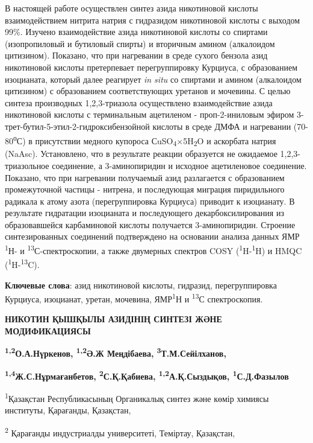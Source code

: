 В настоящей работе осуществлен синтез азида никотиновой кислоты
взаимодействием нитрита натрия с гидразидом никотиновой кислоты с
выходом 99\%. Изучено взаимодействие азида никотиновой кислоты со
спиртами (изопропиловый и бутиловый спирты) и вторичным амином
(алкалоидом цитизином). Показано, что при нагревании в среде сухого
бензола азид никотиновой кислоты претерпевает перегруппировку Курциуса,
с образованием изоцианата, который далее реагирует \emph{in situ} со
спиртами и амином (алкалоидом цитизином) с образованием соответствующих
уретанов и мочевины. С целью синтеза производных 1,2,3-триазола
осуществлено взаимодействие азида никотиновой кислоты с терминальным
ацетиленом - проп-2-иниловым эфиром
3-трет-бутил-5-этил-2-гидроксибензойной кислоты в среде ДМФА и
нагревании (70-80\textsuperscript{о}С) в присутствии медного купороса
СuSO\textsubscript{4}×5H\textsubscript{2}O и аскорбата натрия (NaAsc).
Установлено, что в результате реакции образуется не ожидаемое
1,2,3-триазольное соединение, а 3-аминопиридин и исходное ацетиленовое
соединение. Показано, что при нагревании получаемый азид разлагается с
образованием промежуточной частицы - нитрена, и последующая миграция
пиридильного радикала к атому азота (перегруппировка Курциуса) приводит
к изоцианату. В результате гидратации изоцианата и последующего
декарбоксилирования из образовавшейся карбаминовой кислоты получается
3-аминопиридин. Строение синтезированных соединений подтверждено на
основании анализа данных ЯМР \textsuperscript{1}Н- и
\textsuperscript{13}С-спектроскопии, а также двумерных спектров COSY
(\textsuperscript{1}H-\textsuperscript{1}H) и HMQC
(\textsuperscript{1}H-\textsuperscript{13}C).

{\bfseries Ключевые слова}: азид никотиновой кислоты, гидразид,
перегруппировка Курциуса, изоцианат, уретан, мочевина,
ЯМР\textsuperscript{1}Н и \textsuperscript{13}С спектроскопия.

{\bfseries НИКОТИН ҚЫШҚЫЛЫ АЗИДІНІҢ СИНТЕЗІ ЖӘНЕ МОДИФИКАЦИЯСЫ}

{\bfseries \textsuperscript{1,2}О.А.Нүркенов, \textsuperscript{1,2}Ә.Ж
Меңдібаева, \textsuperscript{3}Т.М.Сейілханов,}

{\bfseries \textsuperscript{1,4}Ж.С.Нұрмағанбетов,
\textsuperscript{2}С.Қ.Қабиева, \textsuperscript{1,2}А.Қ.Сыздықов,
\textsuperscript{1}С.Д.Фазылов}

\textsuperscript{1}Қазақстан Республикасының Органикалық синтез және
көмір химиясы институты, Қарағанды, Қазақстан,

\textsuperscript{2} Қарағанды индустриалды университеті, Теміртау,
Қазақстан,


